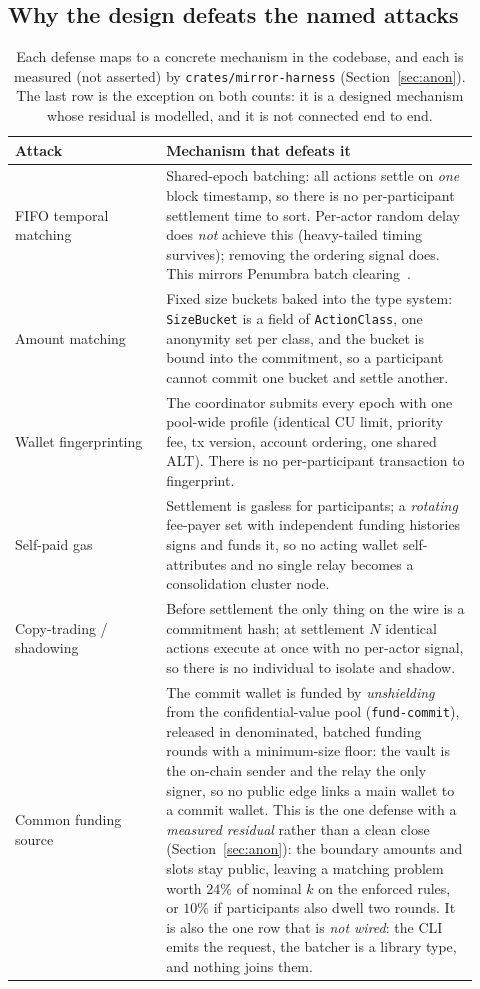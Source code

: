 \documentclass[10pt]{article}
\newcommand{\code}[1]{\texttt{#1}}
\begin{document}
\subsection{Why the design defeats the named attacks}

\begin{table}[h]
\centering
\small
\begin{tabular}{@{}p{0.30\linewidth}p{0.62\linewidth}@{}}
\toprule
\textbf{Attack} & \textbf{Mechanism that defeats it} \\
\midrule
FIFO temporal matching & Shared-epoch batching: all actions settle on \emph{one} block timestamp, so there is no per-participant settlement time to sort. Per-actor random delay does \emph{not} achieve this (heavy-tailed timing survives); removing the ordering signal does. This mirrors Penumbra batch clearing~\cite{penumbra}. \\
Amount matching & Fixed size buckets baked into the type system: \code{SizeBucket} is a field of \code{ActionClass}, one anonymity set per class, and the bucket is bound into the commitment, so a participant cannot commit one bucket and settle another. \\
Wallet fingerprinting & The coordinator submits every epoch with one pool-wide profile (identical CU limit, priority fee, tx version, account ordering, one shared ALT). There is no per-participant transaction to fingerprint. \\
Self-paid gas & Settlement is gasless for participants; a \emph{rotating} fee-payer set with independent funding histories signs and funds it, so no acting wallet self-attributes and no single relay becomes a consolidation cluster node. \\
Copy-trading / shadowing & Before settlement the only thing on the wire is a commitment hash; at settlement $N$ identical actions execute at once with no per-actor signal, so there is no individual to isolate and shadow. \\
Common funding source & The commit wallet is funded by \emph{unshielding} from the confidential-value pool (\code{fund-commit}), released in denominated, batched funding rounds with a minimum-size floor: the vault is the on-chain sender and the relay the only signer, so no public edge links a main wallet to a commit wallet. This is the one defense with a \emph{measured residual} rather than a clean close (Section~\ref{sec:anon}): the boundary amounts and slots stay public, leaving a matching problem worth $24\%$ of nominal $k$ on the enforced rules, or $10\%$ if participants also dwell two rounds. It is also the one row that is \emph{not wired}: the CLI emits the request, the batcher is a library type, and nothing joins them. \\
\bottomrule
\end{tabular}
\caption{Each defense maps to a concrete mechanism in the codebase, and each is
measured (not asserted) by \code{crates/mirror-harness} (Section~\ref{sec:anon}).
The last row is the exception on both counts: it is a designed mechanism whose
residual is modelled, and it is not connected end to end.}
\end{table}
\end{document}
